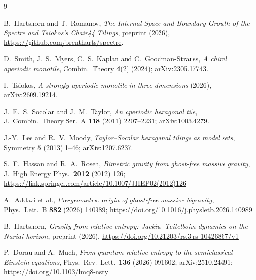 \documentclass[11pt]{article}
\theoremstyle{definition}
\theoremstyle{remark}
\begin{document}
\begin{thebibliography}{9}

 B.~Hartshorn and T.~Romanov, \emph{The Internal Space and Boundary Growth of the Spectre and Tsiokos's Chair44 Tilings}, preprint (2026),
\url{https://github.com/brentharts/spectre}.

 D.~Smith, J.~S.~Myers, C.~S.~Kaplan and C.~Goodman-Strauss, \emph{A chiral aperiodic monotile},
Combin.\ Theory \textbf{4}(2) (2024); arXiv:2305.17743.

 I.~Tsiokos, \emph{A strongly aperiodic monotile in three dimensions} (2026),
arXiv:2609.19214.

 J.~E.~S.~Socolar and J.~M.~Taylor, \emph{An aperiodic hexagonal tile}, J.\ Combin.\ Theory Ser.\ A
\textbf{118} (2011) 2207--2231; arXiv:1003.4279.

 J.-Y.~Lee and R.~V.~Moody, \emph{Taylor--Socolar hexagonal tilings as model sets}, Symmetry
\textbf{5} (2013) 1--46; arXiv:1207.6237.


 S.~F.~Hassan and R.~A.~Rosen, \emph{Bimetric gravity from ghost-free massive gravity},
J.\ High Energy Phys.\ \textbf{2012} (2012) 126; \url{https://link.springer.com/article/10.1007/JHEP02(2012)126}

 A.~Addazi et al., \emph{Pre-geometric origin of ghost-free massive bigravity}, Phys.\ Lett.\ B
\textbf{882} (2026) 140989; \url{https://doi.org/10.1016/j.physletb.2026.140989}

 B.~Hartshorn,
\emph{Gravity from relative entropy: Jackiw--Teitelboim dynamics on the Nariai horizon}, preprint (2026),
\url{https://doi.org/10.21203/rs.3.rs-10426867/v1}

 P.~Dorau and A.~Much, \emph{From quantum relative entropy to the semiclassical Einstein equations}, Phys.\ Rev.\ Lett.\ \textbf{136} (2026) 091602; arXiv:2510.24491;
\url{https://doi.org/10.1103/lmq8-nsty}



\end{thebibliography}
\end{document}

